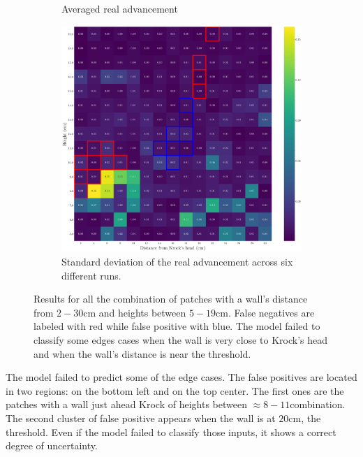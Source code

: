 \documentclass[../document.tex]{subfiles}
\begin{document}
\begin{figure}[htbp]
\begin{subfigure}[b]{0.48\linewidth}
        \caption{Averaged real advancement}
        \label{fig : walls-heights-advs}
    \end{subfigure}   
    \begin{subfigure}[b]{0.48\linewidth}
        \includegraphics[width=\linewidth]{../img/5/custom_patches/walls_heights/walls_heights_std.png}
        \caption{Standard deviation of the real advancement across six different runs.}
        \label{fig : walls-heights-std}
    \end{subfigure}   
\caption{Results for all the combination of patches with a wall's distance from $2-30$cm and heights between $5 - 19$cm. False negatives are labeled with red while false positive with blue. The model failed to classify some edges cases when the wall is very close to Krock's head and when the wall's distance is near the threshold.}    
\label{fig : walls-heights}
\end{figure}
The model failed to predict some of the edge cases. The false positives are located in two regions: on the bottom left and on the top center. The first ones are the patches with a wall just ahead Krock of heights between $\approx 8 - 11$combination. The second cluster of false positive appears when the wall is at $20$cm, the threshold. Even if the model failed to classify those inputs, it shows a correct degree of uncertainty.
\end{document}
